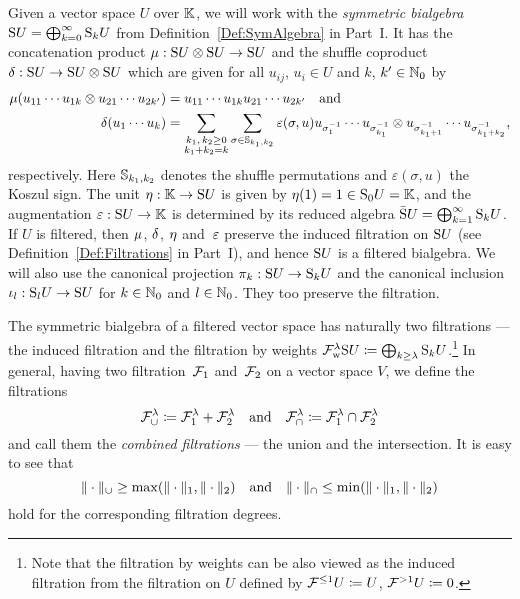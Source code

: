 \documentclass[\MainFolder/Text.tex]{subfiles}
\begin{document}
Given a vector space $U$ over $\mathbb{K}$, we will work with the \emph{symmetric bialgebra} $\mathrm{S} U = \bigoplus_{k=0}^\infty \mathrm{S}_k U$ from Definition~\ref{Def:SymAlgebra} in Part~I. It has the concatenation product $\mu: \mathrm{S} U \otimes \mathrm{S} U \rightarrow \mathrm{S} U$ and the shuffle coproduct $\delta: \mathrm{S} U \rightarrow \mathrm{S} U \otimes \mathrm{S} U$ which are given for all $u_{ij}$, $u_i \in U$ and $k$, $k'\in \mathbb{N}_0$ by
\begin{align*}
\mu(u_{11}\dotsb u_{1k} \otimes u_{21} \dotsb u_{2k'}) &= u_{11} \dotsb u_{1k} u_{21} \dotsb u_{2k'}\quad \text{and}\\
\delta(u_1 \dotsb u_k) &= \sum_{\substack{k_1,\,k_2 \ge 0\\ k_1 + k_2 = k}} \sum_{\sigma\in \mathbb{S}_{k_1, k_2}} \varepsilon(\sigma,u) u_{\sigma^{-1}_1} \dotsb u_{\sigma_{k_1}^{-1}}\otimes u_{\sigma_{k_1+1}^{-1}}\dotsb u_{\sigma_{k_1 + k_2}^{-1}},
\end{align*}
respectively. Here $\mathbb{S}_{k_1,k_2}$ denotes the shuffle permutations and $\varepsilon(\sigma,u)$ the Koszul sign. The unit $\eta: \mathbb{K} \rightarrow \mathrm{S} U$ is given by $\eta(1) = 1 \in \mathrm{S}_0 U = \mathbb{K}$, and the augmentation $\varepsilon: \mathrm{S} U \rightarrow \mathbb{K}$ is determined by its reduced algebra $\bar{\mathrm{S}} U = \bigoplus_{k=1}^\infty \mathrm{S}_k U$. If $U$ is filtered, then $\mu$, $\delta$, $\eta$ and~$\varepsilon$ preserve the induced filtration on $\mathrm{S} U$ (see Definition~\ref{Def:Filtrations} in Part~I), and hence $\mathrm{S} U$ is a filtered bialgebra. We will also use the canonical projection $\pi_k: \mathrm{S} U \rightarrow \mathrm{S}_k U$ and the canonical inclusion $\iota_l: \mathrm{S}_l U \rightarrow \mathrm{S} U$ for $k\in\mathbb{N}_0$ and $l\in \mathbb{N}_0$. They too preserve the filtration.

The symmetric bialgebra of a filtered vector space has naturally two filtrations --- the induced filtration and the filtration by weights $\mathcal{F}_{\mathrm{w}}^\lambda \mathrm{S} U \coloneqq \bigoplus_{k\ge \lambda} \mathrm{S}_k U$.\footnote{Note that the filtration by weights can be also viewed as the induced filtration from the filtration on $U$ defined by $\mathcal{F}^{\le 1}U \coloneqq U$, $\mathcal{F}^{>1}U\coloneqq 0$.} In general, having two filtration~$\mathcal{F}_1$ and~$\mathcal{F}_2$ on a vector space $V$, we define the filtrations
\begin{equation}\label{Eq:CombinedFiltr}
\mathcal{F}_\cup^\lambda \coloneqq \mathcal{F}_1^\lambda + \mathcal{F}_2^\lambda\quad\text{and}\quad\mathcal{F}_\cap^{\lambda} \coloneqq \mathcal{F}_1^\lambda \cap \mathcal{F}_2^\lambda
\end{equation}
and call them the \emph{combined filtrations} --- the union and the intersection. It is easy to see that 
$$ \| \cdot \|_\cup \ge \max(\| \cdot \|_1,\| \cdot \|_{2})\quad\text{and}\quad\| \cdot \|_\cap \le \min(\| \cdot \|_1,\| \cdot \|_{2}) $$
hold for the corresponding filtration degrees.
\end{document}
